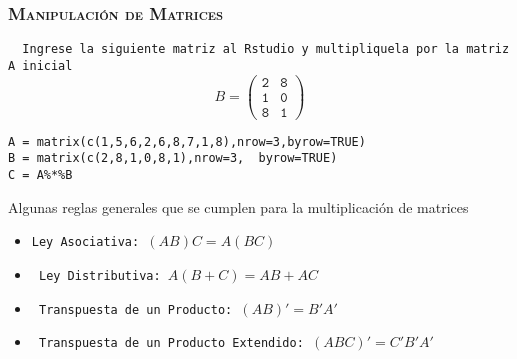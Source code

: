 \documentclass[16.5pt]{beamer}
\begin{document}
{
\begin{frame}
\frametitle{\textsc{\textbf{Manipulación de Matrices}}}
\hspace*{-5mm}
\vspace*{-2mm} 
\vspace{0.3cm}


\texttt{  {\color{red} Ingrese la siguiente matriz al Rstudio y multipliquela por la matriz A inicial} }
$$B= \mathtt{\begin{pmatrix} 2 & 8  \\ 1 & 0 \\ 8 & 1  \end{pmatrix}}$$

\begin{lstlisting}
A = matrix(c(1,5,6,2,6,8,7,1,8),nrow=3,byrow=TRUE)
B = matrix(c(2,8,1,0,8,1),nrow=3,  byrow=TRUE)
C = A%*%B
\end{lstlisting}

Algunas reglas generales que se cumplen para la multiplicación de matrices
\begin{itemize}
\item\texttt{{\color{black}Ley Asociativa:} $(AB)C = A(BC)$} 
\item \texttt{{ \color{black} Ley Distributiva:} $A(B+C) = AB + AC$} 
\item \texttt{{ \color{black} Transpuesta de un Producto:} $(AB)' = B'A'$} 
\item \texttt{{ \color{black} Transpuesta de un Producto Extendido:} $(ABC)' = C'B'A'$} 

\end{itemize}
\end{frame}
}
\end{document}
